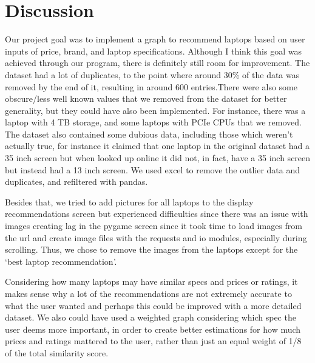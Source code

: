\documentclass{article}
\begin{document}
\section{Discussion}
\par Our project goal was to implement a graph to recommend laptops based on user inputs of price, brand, and laptop specifications. Although I think this goal was achieved through our program, there is definitely still room for improvement. The dataset had a lot of duplicates, to the point where around 30\% of the data was removed by the end of it, resulting in around 600 entries.There were also some obscure/less well known values that we removed from the dataset for better generality, but they could have also been implemented. For instance, there was a laptop with 4 TB storage, and some laptops with PCIe CPUs that we removed. The dataset also contained some dubious data, including those which weren’t actually true, for instance it claimed that one laptop in the original dataset had a 35 inch screen but when looked up online it did not, in fact, have a 35 inch screen but instead had a 13 inch screen. We used excel to remove the outlier data and duplicates, and refiltered with pandas. 
\\
\par Besides that, we tried to add pictures for all laptops to the display recommendations screen but experienced difficulties since there was an issue with images creating lag in the pygame screen since it took time to load images from the url and create image files with the requests and io modules, especially during scrolling. Thus, we chose to remove the images from the laptops except for the ‘best laptop recommendation’.
\\
\par Considering how many laptops may have similar specs and prices or ratings, it makes sense why a lot of the recommendations are not extremely accurate to what the user wanted and perhaps this could be improved with a more detailed dataset. We also could have used a weighted graph considering which spec the user deems more important, in order to create better estimations for how much prices and ratings mattered to the user, rather than just an equal weight of 1/8 of the total similarity score. 
\\ 
\end{document}
